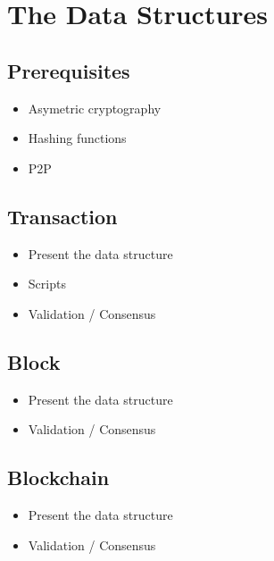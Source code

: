 \documentclass{beamer}
\begin{document}
\section{The Data Structures}
\subsection{Prerequisites}

\begin{frame}
    \begin{itemize}
        \item Asymetric cryptography
        \item Hashing functions
        \item P2P
    \end{itemize}
\end{frame}

\subsection{Transaction}

\begin{frame}
    \begin{itemize}
        \item Present the data structure
        \item Scripts
        \item Validation / Consensus
    \end{itemize}
\end{frame}

\subsection{Block}

\begin{frame}
    \begin{itemize}
        \item Present the data structure
        \item Validation / Consensus
    \end{itemize}
\end{frame}

\subsection{Blockchain}

\begin{frame}
    \begin{itemize}
        \item Present the data structure
        \item Validation / Consensus
    \end{itemize}
\end{frame}
\end{document}
